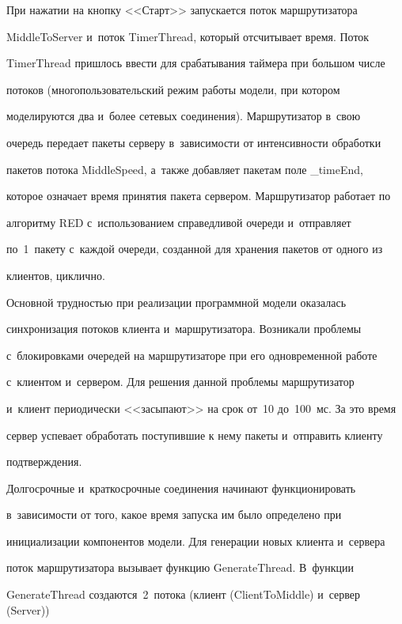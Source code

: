   При нажатии на кнопку <<Старт>> запускается поток маршрутизатора


MiddleToServer и~поток TimerThread, который отсчитывает время. Поток


TimerThread пришлось ввести для срабатывания таймера при большом числе


потоков (многопользовательский режим работы модели, при котором


моделируются два и~более сетевых соединения). Маршрутизатор в~свою


очередь передает пакеты серверу в~зависимости от интенсивности обработки


пакетов потока MiddleSpeed, а~также добавляет пакетам поле \_timeEnd,


которое означает время принятия пакета сервером. Маршрутизатор работает по


алгоритму RED с~использованием справедливой очереди и~отправляет


по~1~пакету с~каждой очереди, созданной для хранения пакетов от одного из


клиентов, циклично.





  Основной трудностью при реализации программной модели оказалась


синхронизация потоков клиента и~маршрутизатора. Возникали проблемы


с~блокировками очередей на маршрутизаторе при его одновременной работе


с~клиентом и~сервером. Для решения данной проблемы маршрутизатор


и~клиент периодически <<засыпают>> на срок от~10 до~100~мс. За это время


сервер успевает обработать поступившие к нему пакеты и~отправить клиенту


подтверждения.





  Долгосрочные и~краткосрочные соединения начинают функционировать


в~зависимости от того, какое время запуска им было определено при


инициализации компонентов модели. Для генерации новых клиента и~сервера


поток маршрутизатора вызывает функцию GenerateThread. В~функции


GenerateThread создаются~2~потока (клиент (ClientToMiddle) и~сервер (Server))


